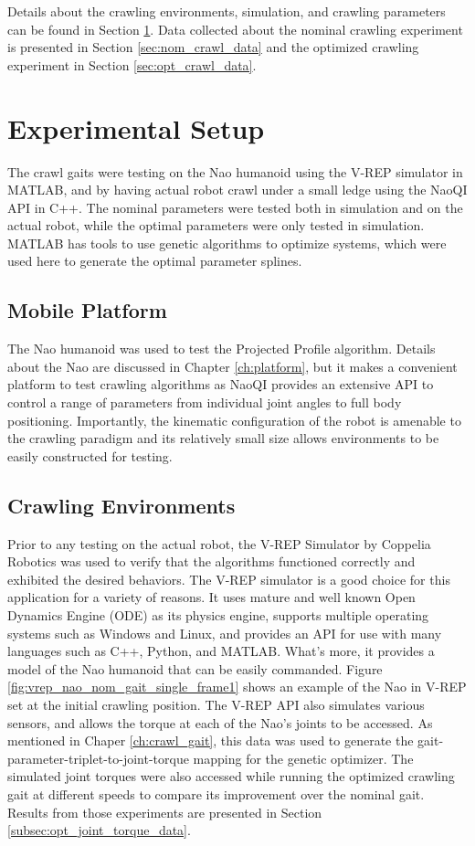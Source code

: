 Details about the crawling environments, simulation, and crawling parameters can be found in
Section \ref{sec:crawl_exp_setup}. Data collected about the nominal crawling experiment is
presented in Section \ref{sec:nom_crawl_data} and the optimized crawling experiment in 
Section \ref{sec:opt_crawl_data}.

\FloatBarrier
\section{Experimental Setup} \label{sec:crawl_exp_setup}
The crawl gaits were testing on the Nao humanoid using the V-REP simulator in MATLAB,
and by having actual robot crawl under a small ledge using the NaoQI API in C++.
The nominal parameters were tested both in simulation and on the actual robot, while
the optimal parameters were only tested in simulation. MATLAB has tools to use genetic
algorithms to optimize systems, which were used here to generate the optimal parameter
splines.

\subsection{Mobile Platform}
The Nao humanoid was used to test the Projected Profile algorithm.
Details about the Nao are discussed in Chapter \ref{ch:platform}, but it makes
a convenient platform to test crawling algorithms as NaoQI provides an extensive
API to control a range of parameters from individual joint angles to 
full body positioning. Importantly, the kinematic configuration of the robot is amenable 
to the crawling paradigm and its relatively small size allows environments to be
easily constructed for testing.

\subsection{Crawling Environments} \label{subsec:crawl_environments}
Prior to any testing on the actual robot, the V-REP Simulator by Coppelia Robotics was used
to verify that the algorithms functioned correctly and exhibited the desired behaviors.
The V-REP simulator is a good choice for this application for a variety of reasons.
It uses mature and well known Open Dynamics Engine (ODE) as its physics engine, supports multiple
operating systems such as Windows and Linux, and provides an API for use with many
languages such as C++, Python, and MATLAB. What's more, it provides a model of the Nao
humanoid that can be easily commanded.
Figure \ref{fig:vrep_nao_nom_gait_single_frame1} shows an example of the Nao in V-REP
set at the initial crawling position.
The V-REP API also simulates various sensors, and allows the torque at each of the Nao's
joints to be accessed. As mentioned in Chaper \ref{ch:crawl_gait}, this data was used
to generate the gait-parameter-triplet-to-joint-torque mapping for the genetic optimizer.
The simulated joint torques were also accessed while running the optimized crawling
gait at different speeds to compare its improvement over the nominal gait.
Results from those experiments are presented in Section \ref{subsec:opt_joint_torque_data}.

